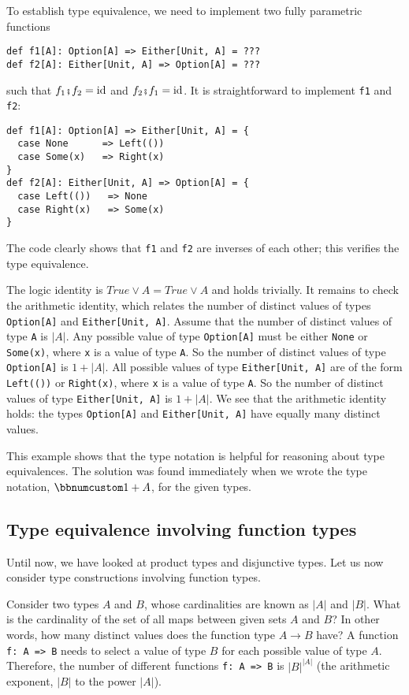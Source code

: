 To establish type equivalence, we need to implement two fully parametric
functions
\begin{lstlisting}
def f1[A]: Option[A] => Either[Unit, A] = ???
def f2[A]: Either[Unit, A] => Option[A] = ???
\end{lstlisting}
such that $f_{1}\bef f_{2}=\text{id}$ and $f_{2}\bef f_{1}=\text{id}$.
It is straightforward to implement \lstinline!f1! and \lstinline!f2!:
\begin{lstlisting}
def f1[A]: Option[A] => Either[Unit, A] = {
  case None      => Left(())
  case Some(x)   => Right(x)
}
def f2[A]: Either[Unit, A] => Option[A] = {
  case Left(())   => None
  case Right(x)   => Some(x)
}
\end{lstlisting}
The code clearly shows that \lstinline!f1! and \lstinline!f2! are
inverses of each other; this verifies the type equivalence.

The logic identity is $True\vee A=True\vee A$ and holds trivially.
It remains to check the arithmetic identity, which relates the number
of distinct values of types \lstinline!Option[A]! and \lstinline!Either[Unit, A]!.
Assume that the number of distinct values of type \lstinline!A! is
$\left|A\right|$. Any possible value of type \lstinline!Option[A]!
must be either \lstinline!None! or \lstinline!Some(x)!, where \lstinline!x!
is a value of type \lstinline!A!. So the number of distinct values
of type \lstinline!Option[A]! is $1+\left|A\right|$. All possible
values of type \lstinline!Either[Unit, A]! are of the form \lstinline!Left(())!
or \lstinline!Right(x)!, where \lstinline!x! is a value of type
\lstinline!A!. So the number of distinct values of type \lstinline!Either[Unit, A]!
is $1+\left|A\right|$. We see that the arithmetic identity holds:
the types \lstinline!Option[A]! and \lstinline!Either[Unit, A]!
have equally many distinct values.

This example shows that the type notation is helpful for reasoning
about type equivalences. The solution was found immediately when we
wrote the type notation, $\bbnum 1+A$, for the given types.

\subsection{Type equivalence involving function types}

Until now, we have looked at product types and disjunctive types.
Let us now consider type constructions involving function types.

Consider two types $A$ and $B$, whose cardinalities are known as
$\left|A\right|$ and $\left|B\right|$. What is the cardinality of
the set of all maps between given sets $A$ and $B$? In other words,
how many distinct values does the function type $A\rightarrow B$
have? A function \lstinline!f: A => B! needs to select a value of
type $B$ for each possible value of type $A$. Therefore, the number
of different functions \lstinline!f: A => B! is $\left|B\right|^{\left|A\right|}$
(the arithmetic exponent, $\left|B\right|$ to the
power $\left|A\right|$).

